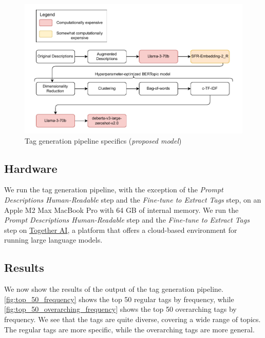 \begin{figure}[h]
    \centering
    \includegraphics[width=\textwidth]{figures/tag_generation_pipeline_specifics.pdf}
    \caption{Tag generation pipeline specifics (\textit{proposed model})}
    \label{fig:tag_generation_pipeline_specifics}
\end{figure}

\subsection{Hardware}
We run the tag generation pipeline, with the exception of the \textit{Prompt Descriptions Human-Readable} step and the \textit{Fine-tune to Extract Tags} step, on an Apple M2 Max MacBook Pro with 64 GB of internal memory. We run the \textit{Prompt Descriptions Human-Readable} step and the \textit{Fine-tune to Extract Tags} step on \href{https://docs.together.ai/docs/introduction}{Together AI}, a platform that offers a cloud-based environment for running large language models.

\subsection{Results}
We now show the results of the output of the tag generation pipeline. \cref{fig:top_50_frequency} shows the top 50 regular tags by frequency, while \cref{fig:top_50_overarching_frequency} shows the top 50 overarching tags by frequency. We see that the tags are quite diverse, covering a wide range of topics. The regular tags are more specific, while the overarching tags are more general.

